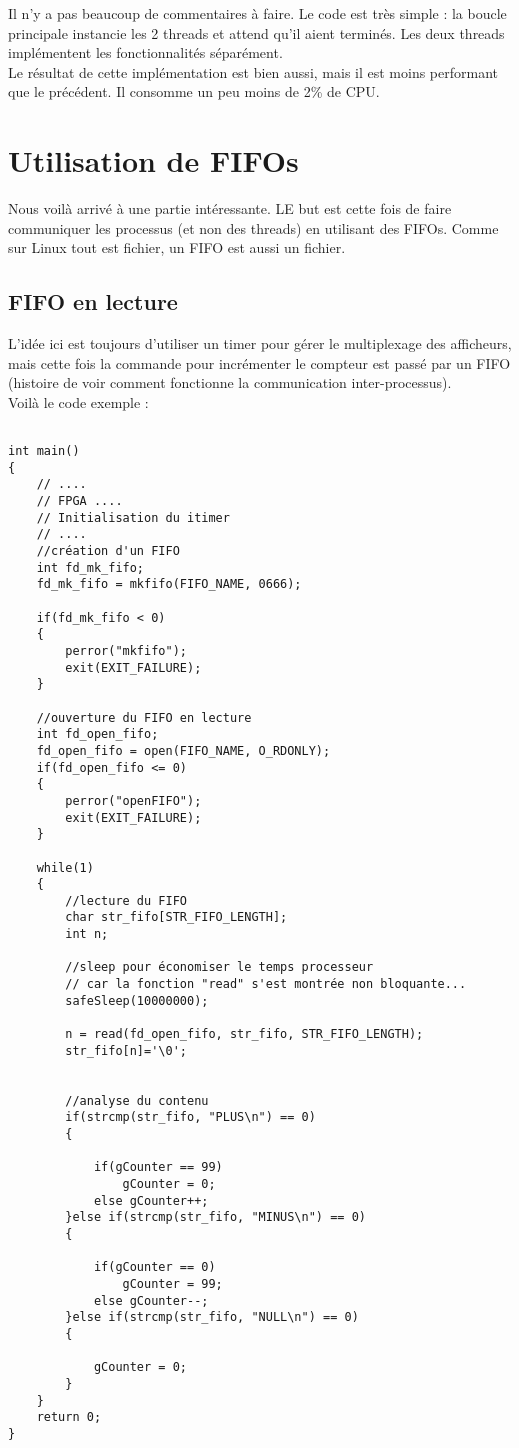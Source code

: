 Il n'y a pas beaucoup de commentaires à faire. Le code est très simple : la boucle principale instancie les 2 threads et attend  qu'il aient terminés. Les deux threads implémentent les fonctionnalités séparément.\\


Le résultat de cette implémentation est bien aussi, mais il est moins performant que le précédent. Il consomme un peu moins de 2\% de CPU.

 
\newpage\section{Utilisation de FIFOs}
Nous voilà arrivé à une partie intéressante. LE but est cette fois de faire communiquer les processus (et non des threads) en utilisant des FIFOs. Comme sur Linux tout est fichier, un FIFO est aussi un fichier.\\
\subsection{FIFO en lecture}
L'idée ici est toujours d'utiliser un timer pour gérer le multiplexage des afficheurs, mais cette fois la commande pour incrémenter le compteur est passé par un FIFO (histoire de voir comment fonctionne la communication inter-processus).\\

Voilà le code exemple :
\begin{lstlisting}[frame=single,style=C]  % Start your code-block

int main()
{
	// ....
	// FPGA ....
	// Initialisation du itimer
	// ....
	//création d'un FIFO
	int fd_mk_fifo;
	fd_mk_fifo = mkfifo(FIFO_NAME, 0666);

	if(fd_mk_fifo < 0)
	{
		perror("mkfifo");
		exit(EXIT_FAILURE);
	}

	//ouverture du FIFO en lecture
	int fd_open_fifo;
	fd_open_fifo = open(FIFO_NAME, O_RDONLY);
	if(fd_open_fifo <= 0)
	{
		perror("openFIFO");
		exit(EXIT_FAILURE);
	}

	while(1)
	{
		//lecture du FIFO
		char str_fifo[STR_FIFO_LENGTH];
		int n;

		//sleep pour économiser le temps processeur
		// car la fonction "read" s'est montrée non bloquante...
		safeSleep(10000000);

		n = read(fd_open_fifo, str_fifo, STR_FIFO_LENGTH);
		str_fifo[n]='\0';


		//analyse du contenu
		if(strcmp(str_fifo, "PLUS\n") == 0)
		{

			if(gCounter == 99)
				gCounter = 0;
			else gCounter++;
		}else if(strcmp(str_fifo, "MINUS\n") == 0)
		{

			if(gCounter == 0)
				gCounter = 99;
			else gCounter--;
		}else if(strcmp(str_fifo, "NULL\n") == 0)
		{

			gCounter = 0;
		}
	}
	return 0;
}
\end{lstlisting}

